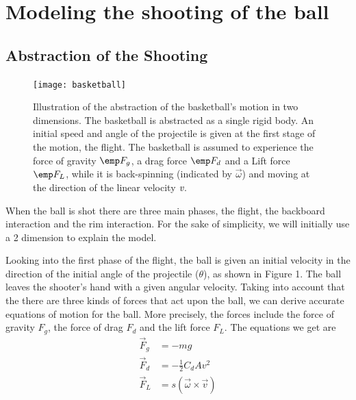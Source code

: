 \documentclass[twocolumn]{IEEEtran}
\begin{document}
\section{Modeling the shooting of the ball}

\subsection{Abstraction of the Shooting}

\begin{figure}[!ht]
\texttt{[image: basketball]}
\caption{Illustration of the abstraction of the basketball's motion in two dimensions. The basketball is abstracted as a single rigid body. An initial speed and angle of the projectile is given at the first stage of the motion, the flight. The basketball is assumed to experience the force of gravity $\emp F_g$, a drag force $\emp F_d$ and a Lift force $\emp F_L$, while it is back-spinning (indicated by $\vec \omega$) and moving at the direction of the linear velocity $\emph v$.}
\end{figure}

When the ball is shot there are three main phases, the flight, the backboard interaction and the rim interaction. For the sake of simplicity, we will initially use a 2 dimension to explain the model.

Looking into the first phase of the flight, the ball is given an initial velocity in the direction of the initial angle of the projectile ($\theta$), as shown in Figure 1. The ball leaves the shooter's hand with a given angular velocity. Taking into account that the there are three kinds of forces that act upon the ball, we can derive accurate equations of motion for the ball. More precisely, the forces include the force of gravity $F_g$, the force of drag $F_d$ and the lift force $F_L$. The equations we get are
\begin{align}
\vec F_g &= -m g\\
\vec F_d &= -\frac{1}{2} C_d A v^2\\
\vec F_L &= s (\vec \omega \times \vec v)
\end{align}
\end{document}
